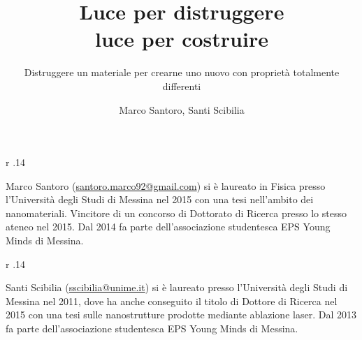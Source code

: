 ﻿\title{Luce per distruggere\\luce per costruire}
\subtitle{Distruggere un materiale per crearne uno nuovo con proprietà totalmente differenti}
\suptitle{}
\author{Marco Santoro, Santi Scibilia}
\maketitle
\begin{small}
\pichskip{4mm}
\nobalance



\vfill
\begin{thebiography}{}%
\begin{wrapfigure}[4]%
{r}%
{.14\columnwidth}
  \vskip-12pt
\end{wrapfigure}
Marco Santoro (\url{santoro.marco92@gmail.com}) si è laureato in Fisica presso
l'Università degli Studi di Messina nel 2015 con una tesi nell'ambito dei nanomateriali.
Vincitore di un concorso di Dottorato di Ricerca presso lo stesso ateneo nel 2015.
Dal 2014 fa parte dell'associazione studentesca EPS Young Minds di Messina.

\begin{wrapfigure}[4]%
{r}%
{.14\columnwidth}
  \vskip-12pt
\end{wrapfigure}
Santi Scibilia (\url{sscibilia@unime.it}) si è laureato presso l'Università degli Studi di Messina nel 2011, dove ha anche conseguito il titolo di Dottore di Ricerca nel 2015 con una tesi sulle nanostrutture prodotte mediante ablazione laser. Dal 2013 fa parte dell'associazione studentesca EPS Young Minds di Messina.
\end{thebiography}
\end{small}

